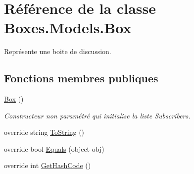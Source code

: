 \hypertarget{class_boxes_1_1_models_1_1_box}{}\section{Référence de la classe Boxes.\+Models.\+Box}
\label{class_boxes_1_1_models_1_1_box}


Représente une boite de discussion.  


\subsection*{Fonctions membres publiques}
\begin{DoxyCompactItemize}
\item 
\hyperlink{class_boxes_1_1_models_1_1_box_a068c3192bb99885af1bfa9e69d6f1be3}{Box} ()
\begin{DoxyCompactList}\small\item\em Constructeur non paramétré qui initialise la liste {\ttfamily Subscribers}. \end{DoxyCompactList}\item 
override string \hyperlink{class_boxes_1_1_models_1_1_box_a02cf68c2b3d26c164d379b83051f4ecf}{To\+String} ()
\item 
override bool \hyperlink{class_boxes_1_1_models_1_1_box_a0ef67d68dedaa193dbe1f897fafe92c9}{Equals} (object obj)
\item 
override int \hyperlink{class_boxes_1_1_models_1_1_box_ac3c5c73dca2ef56365344a11a9e1645e}{Get\+Hash\+Code} ()
\end{DoxyCompactItemize}
